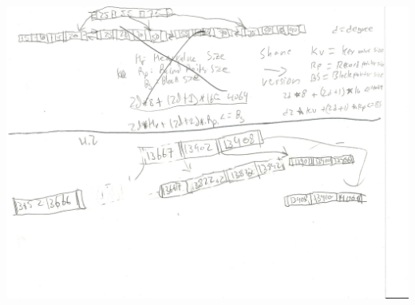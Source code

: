 \documentclass[11pt]{article}
\begin{document}
\begin{enumerate}
	\includegraphics{fourPointTwo.jpeg}


	
	
	

\end{enumerate}
\end{document}

